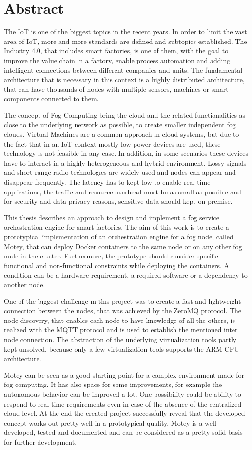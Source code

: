 \chapter*{Abstract}\label{chapter:abstract}
The \ac{IoT} is one of the biggest topics in the recent years.
In order to limit the vast area of \ac{IoT}, more and more standards are defined and subtopics established.
The Industry 4.0, that includes smart factories, is one of them, with the goal to improve the value chain in a factory, enable process automation and adding intelligent connections between different companies and units.
The fundamental architecture that is necessary in this context is a highly distributed architecture, that can have thousands of nodes with multiple sensors, machines or smart components connected to them.

The concept of Fog Computing bring the cloud and the related functionalities as close to the underlying network as possible, to create smaller independent fog clouds.
Virtual Machines are a common approach in cloud systems, but due to the fact that in an \ac{IoT} context mostly low power devices are used, these technology is not feasible in any case.
In addition, in some scenarios these devices have to interact in a highly heterogeneous and hybrid environment.
Lossy signals and short range radio technologies are widely used and nodes can appear and disappear frequently.
The latency has to kept low to enable real-time applications, the traffic and resource overhead must be as small as possible and for security and data privacy reasons, sensitive data should kept on-premise.

This thesis describes an approach to design and implement a fog service orchestration engine for smart factories.
The aim of this work is to create a prototypical implementation of an orchestration engine for a fog node, called Motey, that can deploy Docker containers to the same node or on any other fog node in the cluster.
Furthermore, the prototype should consider specific functional and non-functional constraints while deploying the containers.
A condition can be a hardware requirement, a required software or a dependency to another node.

One of the biggest challenge in this project was to create a fast and lightweight connection between the nodes, that was achieved by the ZeroMQ protocol.
The node discovery, that enables each node to have knowledge of all the others, is realized with the \acs{MQTT} protocol and is used to establish the mentioned inter node connection.
The abstraction of the underlying virtualization tools partly kept unsolved, because only a few virtualization tools supports the ARM \acs{CPU} architecture.

Motey can be seen as a good starting point for a complex environment made for fog computing.
It has also space for some improvements, for example the autonomous behavior can be improved a lot.
One possibility could be ability to respond to real-time requirements even in case of the absence of the centralized cloud level.
At the end the created project successfully reveal that the developed concept works out pretty well in a prototypical quality.
Motey is a well developed, tested and documented and can be considered as a pretty solid basis for further development.
